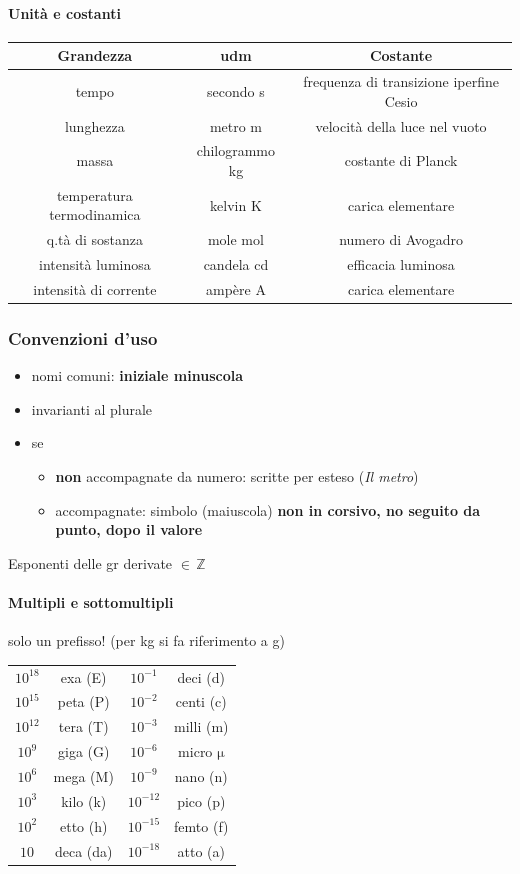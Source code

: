 \documentclass[10pt, oneside]{book}
\begin{document}
\paragraph{Unità e costanti}
\begin{table}[h!]
\centering
\begin{tabular}{c|c|c}
\textbf{Grandezza} & \textbf{udm} & \textbf{Costante}\\\hline
tempo & secondo s & frequenza di transizione iperfine Cesio\\
lunghezza & metro m & velocità della luce nel vuoto\\
massa & chilogrammo kg & costante di Planck\\
temperatura termodinamica & kelvin K & carica elementare\\
q.tà di sostanza & mole mol & numero di Avogadro\\
intensità luminosa & candela cd & efficacia luminosa\\
intensità di corrente & ampère A & carica elementare
\end{tabular}
\end{table}

\subsubsection*{Convenzioni d'uso}
\begin{itemize}
\item nomi comuni: \textbf{iniziale minuscola}
\item invarianti al plurale
\item se
\begin{itemize}
\item \textbf{non} accompagnate da numero: scritte per esteso (\textit{Il metro})
\item accompagnate: simbolo (maiuscola) \textbf{non in corsivo, no seguito da punto, dopo il valore}
\end{itemize}
\end{itemize}
Esponenti delle gr derivate $\in \, \mathbb{Z}$

\paragraph{Multipli e sottomultipli} solo un prefisso! (per kg si fa riferimento a g)
\begin{table}[h!]
\centering
\begin{tabular}{c c | c c}
$10^{18}$ & exa (E) & $10^{-1}$ & deci (d)\\
$10^{15}$ & peta (P) & $10^{-2}$ & centi (c)\\
$10^{12}$ & tera (T) & $10^{-3}$ & milli (m)\\
$10^{9}$ & giga (G) & $10^{-6}$ & micro $\mathrm{\mu}$ \\
$10^{6}$ & mega (M) & $10^{-9}$ & nano (n)\\
$10^{3}$ & kilo (k) & $10^{-12}$ & pico (p)\\
$10^{2}$ & etto (h) & $10^{-15}$ & femto (f)\\
$10^{}$ & deca (da) & $10^{-18}$ & atto (a)\\
\end{tabular}
\end{table}
\end{document}
